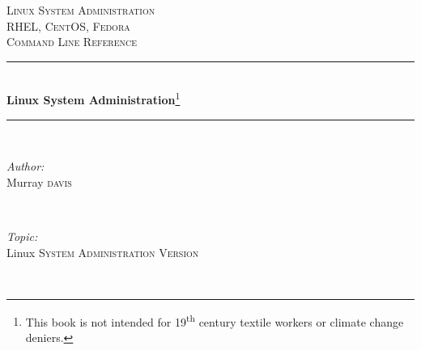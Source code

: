 \begin{titlepage}

\newcommand{\HRule}{\rule{\linewidth}{0.5mm}} %

\center %
 
%
\textsc{\LARGE Linux System Administration}\\[1.5cm] %
\textsc{\Large RHEL, CentOS, Fedora}\\[1.0cm] %
\textsc{\large Command Line Reference}\\[0.5cm] %


\HRule \\[0.4cm]
{ \huge \bfseries Linux System Administration}\footnote{This book is not intended for 19\textsuperscript{th} century textile workers or climate change deniers.}\\[0.4cm] %
\HRule \\[1.5cm]
 
%
%
\begin{minipage}{0.4\textwidth} %
\begin{flushleft} \large
\emph{Author:}\\ %
Murray \textsc{davis} %
\end{flushleft}
\end{minipage}
~
\begin{minipage}{0.4\textwidth}
\begin{flushright} \large
\emph{Topic:} \\
Linux \textsc{System Administration Version \versionnumber} 
\end{flushright}
\end{minipage}\\[4cm]


\end{titlepage}
